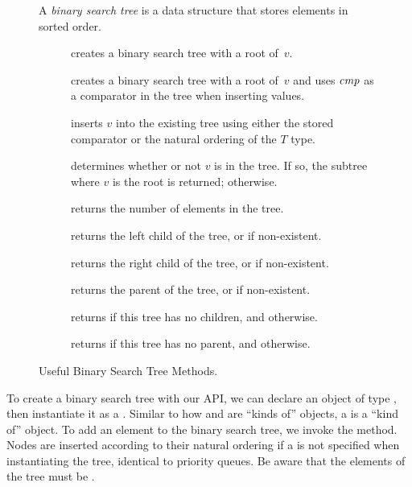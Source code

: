 \begin{figure}[tp]
    \small
    \begin{tcolorbox}[title=Teaching Java Binary Search Trees]
      A \emph{binary search tree} is a data structure that stores elements in sorted order.
      \vspace{2ex}
    \begin{description}
      \item [] creates a binary search tree with a root of~$v$.
      \item [] creates a binary search tree with a root of~$v$ and uses $\emph{cmp}$ as a comparator in the tree when inserting values.
      \item [] inserts $v$ into the existing tree using either the stored comparator or the natural ordering of the $T$ type.
      \item [] determines whether or not $v$ is in the tree. If so, the subtree where $v$ is the root is returned;  otherwise.
      \item [] returns the number of elements in the tree.
      \item [] returns the left child of the tree, or  if non-existent.
      \item [] returns the right child of the tree, or  if non-existent.
      \item [] returns the parent of the tree, or  if non-existent.
      \item [] returns  if this tree has no children, and  otherwise.
      \item [] returns  if this tree has no parent, and  otherwise.
    \end{description}
  \end{tcolorbox}
    \caption{Useful Binary Search Tree Methods.}
    \label{fig:bstmethods}
  \end{figure}

To create a binary search tree with our API, we can declare an object of type , then instantiate it as a . 
Similar to how  and  are ``kinds of''  objects, a  is a ``kind of''  object.
To add an element to the binary search tree, we invoke the  method. 
Nodes are inserted according to their natural ordering if a  is not specified when instantiating the tree, identical to priority queues. 
Be aware that the elements of the tree must be .

